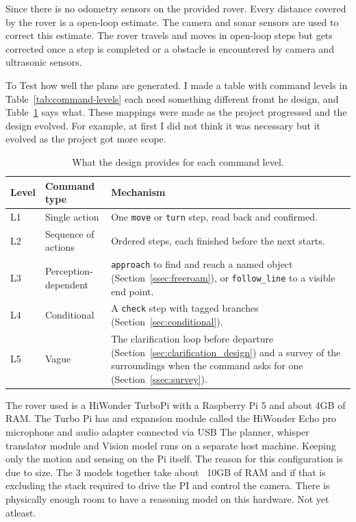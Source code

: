Since there is no odometry sensors on the provided rover. Every distance covered by the 
rover is a open-loop estimate. The camera and sonar sensors are used to correct this estimate. 
The rover travels and moves in open-loop steps but gets corrected once a step is completed or 
a obstacle is encountered by camera and ultrasonic sensors. 

To Test how well the plans are generated. I made a table with command levels in Table~\ref{tab:command-levels}
each need something different fromt he design, and Table~\ref{tab:level_map} says what. These mappings were made
as the project progressed and the design evolved. For example, at first I did not think it was necessary but it evolved as
the project got more scope.

\begin{table}[htbp]
  \centering
  \caption{What the design provides for each command level.}
  \label{tab:level_map}
  \small
  \begin{tabular}{@{}l p{4.0cm} p{6.4cm}@{}}
    \toprule
    Level & Command type & Mechanism \\
    \midrule
    L1 & Single action & One \texttt{move} or \texttt{turn} step, read back and confirmed. \\
    L2 & Sequence of actions & Ordered steps, each finished before the next starts. \\
    L3 & Perception-dependent & \texttt{approach} to find and reach a named object (Section~\ref{ssec:freeroam}), or \texttt{follow\_line} to a visible end point. \\
    L4 & Conditional & A \texttt{check} step with tagged branches (Section~\ref{sec:conditional}). \\
    L5 & Vague & The clarification loop before departure (Section~\ref{sec:clarification_design}) and a survey of the surroundings when the command asks for one (Section~\ref{ssec:survey}). \\
    \bottomrule
  \end{tabular}
\end{table}
\label{sec:architecture}


\label{ssec:split}
The rover used is a HiWonder TurboPi with a Raspberry Pi 5 and about 4GB of RAM. The Turbo Pi has 
and expansion module called the HiWonder Echo pro microphone and audio adapter connected via USB 
The planner, whisper translator module and Vision model runs on a separate host machine. Keeping only the
motion and sensing on the Pi itself. The reason for this configuration is due to size. The 3 models together take about
~10GB of RAM and if that is excluding the stack required to drive the PI and control the camera. There is physically enough room
to have a reasoning model on this hardware. Not yet atleast.

